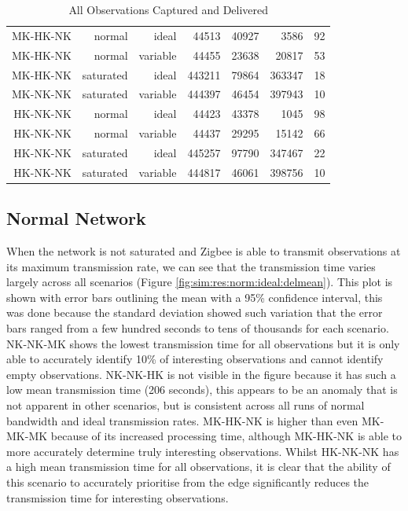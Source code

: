\begin{landscape}
\begin{table}[htbp]
\begin{tabular}{rrrrrrr}
\rowcolor{Gray}
    MK-HK-NK & normal & ideal & 44513 & 40927 & 3586  & 92 \\
\rowcolor{Gray}
    MK-HK-NK & normal & variable & 44455 & 23638 & 20817 & 53 \\
\rowcolor{Gray}
    MK-HK-NK & saturated & ideal & 443211 & 79864 & 363347 & 18 \\
\rowcolor{Gray}
    MK-NK-NK & saturated & variable & 444397 & 46454 & 397943 & 10 \\
    HK-NK-NK & normal & ideal & 44423 & 43378 & 1045  & 98 \\
    HK-NK-NK & normal & variable & 44437 & 29295 & 15142 & 66 \\
    HK-NK-NK & saturated & ideal & 445257 & 97790 & 347467 & 22 \\
    HK-NK-NK & saturated & variable & 444817 & 46061 & 398756 & 10 \\
    \bottomrule

    \end{tabular}%
    \caption{All Observations Captured and Delivered}
\end{table}%
\label{tab:delnum}%
\end{landscape}

\subsection{Normal Network}

When the network is not saturated and Zigbee is able to transmit observations at its maximum transmission rate, we can see that the transmission time varies largely across all scenarios (Figure \ref{fig:sim:res:norm:ideal:delmean}).  This plot is shown with error bars outlining the mean with a 95\% confidence interval, this was done because the standard deviation showed such variation that the error bars ranged from a few hundred seconds to tens of thousands for each scenario. NK-NK-MK shows the lowest transmission time for all observations but it is only able to accurately identify 10\% of interesting observations and cannot identify empty observations. NK-NK-HK is not visible in the figure because it has such a low mean transmission time (206 seconds), this appears to be an anomaly that is not apparent in other scenarios, but is consistent across all runs of normal bandwidth and ideal transmission rates. MK-HK-NK is higher than even MK-MK-MK because of its increased processing time, although MK-HK-NK is able to more accurately determine truly interesting observations. Whilst HK-NK-NK has a high mean transmission time for all observations, it is clear that the ability of this scenario to accurately prioritise from the edge significantly reduces the transmission time for interesting observations.

